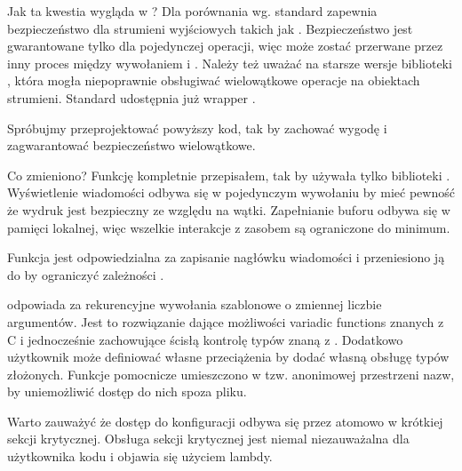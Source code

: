 Jak ta kwestia wygląda w \Cpp{} ?
Dla porównania wg.  standard zapewnia bezpieczeństwo dla strumieni wyjściowych takich jak . Bezpieczeństwo jest gwarantowane tylko dla pojedynczej operacji, więc  może zostać przerwane przez inny proces między wywołaniem  i . Należy też uważać na starsze wersje biblioteki , która mogła niepoprawnie obsługiwać wielowątkowe operacje na obiektach strumieni. Standard  udostępnia już wrapper .

Spróbujmy przeprojektować powyższy kod, tak by zachować wygodę  i zagwarantować bezpieczeństwo wielowątkowe.

Co zmieniono?
Funkcję  kompletnie przepisałem, tak by używała tylko biblioteki \Cpp{}. Wyświetlenie wiadomości odbywa się w pojedynczym wywołaniu  by mieć pewność że wydruk jest bezpieczny ze względu na wątki. Zapełnianie buforu  odbywa się w pamięci lokalnej, więc wszelkie interakcje z zasobem  są ograniczone do minimum.

Funkcja  jest odpowiedzialna za zapisanie nagłówku wiadomości i przeniesiono ją do  by ograniczyć zależności .

 odpowiada za rekurencyjne wywołania szablonowe o zmiennej liczbie argumentów. Jest to rozwiązanie dające możliwości variadic functions znanych z C i jednocześnie zachowujące ścisłą kontrolę typów znaną z \Cpp{}. Dodatkowo użytkownik może definiować własne przeciążenia  by dodać własną obsługę typów złożonych. Funkcje pomocnicze umieszczono w tzw. anonimowej przestrzeni nazw, by uniemożliwić dostęp do nich spoza pliku.

Warto zauważyć że dostęp do konfiguracji odbywa się przez  atomowo w krótkiej sekcji krytycznej. Obsługa sekcji krytycznej jest niemal niezauważalna dla użytkownika kodu i objawia się użyciem lambdy.

